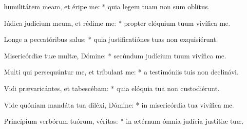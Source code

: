 \begin{psalmus}

 humilitátem meam, et éripe me: * quia legem tuam non sum oblítus.

Iúdica judícium meum, et rédime me: * propter elóquium tuum vivífica me.

Longe a peccatóribus salus: * quia justificatiónes tuas non exquisiérunt.

Misericórdiæ tuæ multæ, Dómine: * secúndum judícium tuum vivífica me.

Multi qui persequúntur me, et tríbulant me: * a testimóniis tuis non declinávi.

Vidi prævaricántes, et tabescébam: * quia elóquia tua non custodiérunt.

Vide quóniam mandáta tua diléxi, Dómine: * in misericórdia tua vivífica me.

Princípium verbórum tuórum, véritas: * in ætérnum ómnia judícia justítiæ tuæ.

\end{psalmus}
